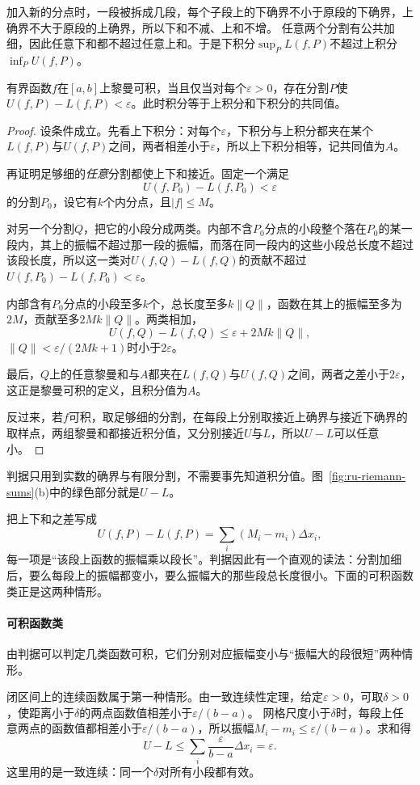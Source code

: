 加入新的分点时，一段被拆成几段，每个子段上的下确界不小于原段的下确界，上确界不大于原段的上确界，所以下和不减、上和不增。
任意两个分割有公共加细，因此任意下和都不超过任意上和。于是下积分$\sup_PL(f,P)$不超过上积分$\inf_PU(f,P)$。
\begin{theorem}[Darboux判据]
\label{thm:ru-darboux-criterion}
有界函数$f$在$[a,b]$上黎曼可积，当且仅当对每个$\varepsilon>0$，存在分割$P$使$U(f,P)-L(f,P)<\varepsilon$。此时积分等于上积分和下积分的共同值。
\end{theorem}
\begin{proof}
设条件成立。先看上下积分：对每个$\varepsilon$，下积分与上积分都夹在某个$L(f,P)$与$U(f,P)$之间，两者相差小于$\varepsilon$，所以上下积分相等，记共同值为$A$。

再证明足够细的\emph{任意}分割都使上下和接近。固定一个满足
\[
 U(f,P_0)-L(f,P_0)<\varepsilon
\]
的分割$P_0$，设它有$k$个内分点，且$|f|\leq M$。

对另一个分割$Q$，把它的小段分成两类。内部不含$P_0$分点的小段整个落在$P_0$的某一段内，其上的振幅不超过那一段的振幅，而落在同一段内的这些小段总长度不超过该段长度，所以这一类对$U(f,Q)-L(f,Q)$的贡献不超过$U(f,P_0)-L(f,P_0)<\varepsilon$。

内部含有$P_0$分点的小段至多$k$个，总长度至多$k\|Q\|$，函数在其上的振幅至多为$2M$，贡献至多$2Mk\|Q\|$。两类相加，
\[
 U(f,Q)-L(f,Q)\leq\varepsilon+2Mk\|Q\|,
\]
$\|Q\|<\varepsilon/(2Mk+1)$时小于$2\varepsilon$。

最后，$Q$上的任意黎曼和与$A$都夹在$L(f,Q)$与$U(f,Q)$之间，两者之差小于$2\varepsilon$，这正是黎曼可积的定义，且积分值为$A$。

反过来，若$f$可积，取足够细的分割，在每段上分别取接近上确界与接近下确界的取样点，两组黎曼和都接近积分值，又分别接近$U$与$L$，所以$U-L$可以任意小。
\end{proof}
判据只用到实数的确界与有限分割，不需要事先知道积分值。图~\ref{fig:ru-riemann-sums}(b)中的绿色部分就是$U-L$。

把上下和之差写成
\[
 U(f,P)-L(f,P)=\sum_i(M_i-m_i)\Delta x_i,
\]
每一项是“该段上函数的振幅乘以段长”。判据因此有一个直观的读法：分割加细后，要么每段上的振幅都变小，要么振幅大的那些段总长度很小。下面的可积函数类正是这两种情形。

\paragraph{可积函数类}
由判据可以判定几类函数可积，它们分别对应振幅变小与“振幅大的段很短”两种情形。

闭区间上的连续函数属于第一种情形。由一致连续性定理，给定$\varepsilon>0$，可取$\delta>0$，使距离小于$\delta$的两点函数值相差小于$\varepsilon/(b-a)$。
网格尺度小于$\delta$时，每段上任意两点的函数值都相差小于$\varepsilon/(b-a)$，所以振幅$M_i-m_i\leq\varepsilon/(b-a)$。求和得
\[
 U-L\leq\sum_i\frac\varepsilon{b-a}\Delta x_i=\varepsilon.
\]这里用的是一致连续：同一个$\delta$对所有小段都有效。

